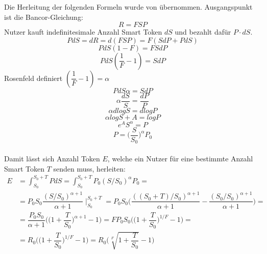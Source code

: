 \documentclass[12pt,a4paper,titlepage,oneside,english]{article}
\begin{document}
Die Herleitung der folgenden Formeln wurde von \citet[S.1f.]{Rosenfeld2017} übernommen. Ausgangspunkt ist die Bancor-Gleichung:\\
\begin{equation*}
R = FSP
\end{equation*}
Nutzer kauft indefinitesimale Anzahl Smart Token $dS$ und bezahlt dafür $P\cdot dS$.
\begin{equation*}
P dS = dR = d(FSP) = F(S dP+ P dS)
\end{equation*}
\begin{equation*}
P dS(1-F) = FS dP
\end{equation*}
\begin{equation*}
P dS(\dfrac{1}{F}-1) = S dP
\end{equation*}
Rosenfeld definiert $(\dfrac{1}{F}-1)= \alpha$
\begin{equation*}
P dS \alpha = S dP
\end{equation*}
\begin{equation*}
\alpha \dfrac{dS}{S} = \dfrac{dP}{P}
\end{equation*}
\begin{equation*}
\alpha d logS = d logP
\end{equation*}
\begin{equation*}
\alpha log S + A = log P
\end{equation*}
\begin{equation*}
e^A S^\alpha = P
\end{equation*}
\begin{equation*}
P = \biggl(\dfrac{S}{S_{0}}\biggr)^\alpha P_{0} 
\end{equation*}\\
Damit lässt sich Anzahl Token $E$, welche ein Nutzer für eine bestimmte Anzahl Smart Token $T$ senden muss, herleiten:\\
\begin{align*}
E  &= \int_{S_{0}}^{S_{0}+T} P dS = \int_{S_{0}}^{S_{0}+T} P_{0}(S/S_{0})^{\alpha}P_{0} = \\
&= P_{0}S_{0}\dfrac{(S/S_{0})^{\alpha + 1}}{\alpha + 1}\mid_{S_{0}}^{S_{0}+T} = P_{0}S_{0} \Biggl(\dfrac{((S_{0}+T)/S_{0})^{\alpha +1}}{\alpha + 1} - \dfrac{(S_{0}/S_{0})^{\alpha + 1}}{\alpha + 1}\Biggr) = \\
&= \dfrac{P_{0}S_{0}}{\alpha + 1}\Biggl(\biggl(1 + \dfrac{T}{S_{0}}\biggr)^{\alpha + 1} -1\Biggr) = FP_{0}S_{0}\Biggl(\biggl(1 + \dfrac{T}{S_{0}}\biggr)^{1/F} -1\Biggr) = \\
&= R_{0}\Biggl(\biggl(1 + \dfrac{T}{S_{0}}\biggr)^{1/F} -1\Biggr) = R_{0}\Biggl( \sqrt[F]{1+\dfrac{T}{S_{0}}} -1 \Biggr) \\
\end{align*}
\end{document}
